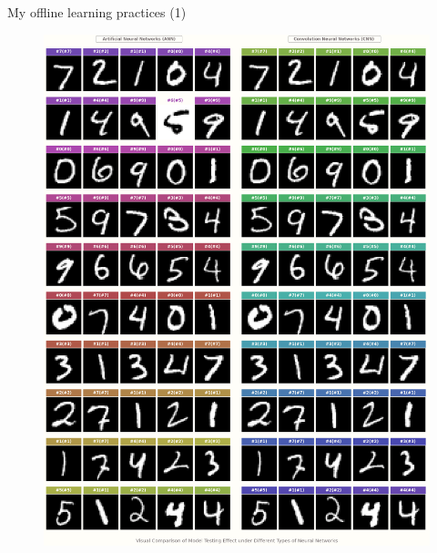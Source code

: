 \documentclass{beamer}
\begin{document}
	\begin{frame}[fragile]{My offline learning practices (1)}
		\begin{figure}[!htb]
			\endminipage\hfill
			\centering\includegraphics[width=\linewidth]{images/deep_learning_1.png}
			\endminipage\hfill

\end{figure}
\end{frame}
\end{document}
